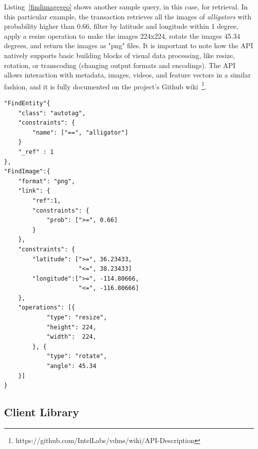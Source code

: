 Listing~\ref{findimagegeo} shows another sample query, in this case, for retrieval.
In this particular example, the transaction retrieves all the images
of \textit{alligators} with probability higher than 0.66,
filter by latitude and longitude within 1 degree,
apply a resize operation to make the images 224x224,
rotate the images 45.34 degrees, and return the images as "png" files.
It is important to note how the API natively supports basic building
blocks of visual data processing, like resize, rotation, or transcoding
(changing output formats and encodings).
The API allows interaction with metadata, images, videos,
and feature vectors in a similar fashion, and it is fully
documented on the project's Github
wiki~\footnote{https://github.com/IntelLabs/vdms/wiki/API-Description}.

\begin{listing}[ht!]
\begin{verbatim}
"FindEntity"{
    "class": "autotag",
    "constraints": {
        "name": ["==", "alligator"]
    }
    "_ref" : 1
},
"FindImage":{
    "format": "png",
    "link": {
        "ref":1,
        "constraints": {
            "prob": [">=", 0.66]
        }
    },
    "constraints": {
        "latitude": [">=", 36.23433,
                     "<=", 38.23433]
        "longitude":[">=", -114.80666,
                     "<=", -116.80666]
    },
    "operations": [{
            "type": "resize",
            "height": 224,
            "width":  224,
        }, {
            "type": "rotate",
            "angle": 45.34
    }]
}

\end{verbatim}
\caption{Sample Query for Image Retrieval -
The query expresses the following:
Find all the images connected to the autotag \textit{alligator}
with probability higher than 0.66,
filter the images by latitude and longitude within 1 degree,
apply a resize operation to make the images 224x224,
rotate the image 45.34 degrees,
and return the images as "png" files.}
\label{findimagegeo}
\end{listing}

\subsection{Client Library}

